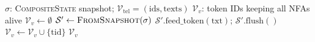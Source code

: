 
\begin{algorithm}[H]
\caption{\textsc{BuildGanaMask}: Dynamic NFA Token Mask}
\label{alg:build-mask}
\scriptsize
\begin{algorithmic}[1]
\Require $\sigma$: \textsc{CompositeState} snapshot;\;
         $\mathcal{V}_{\text{tel}} = (\text{ids}, \text{texts})$
\Ensure $\mathcal{V}_v$: token IDs keeping all NFAs alive
\State $\mathcal{V}_v \gets \emptyset$
    \State $\mathcal{S}' \gets
           \textsc{FromSnapshot}(\sigma)$
    \State $\mathcal{S}'.\text{feed\_token}(\text{txt})$;\;
           $\mathcal{S}'.\text{flush}()$
        \State $\mathcal{V}_v \gets \mathcal{V}_v
               \cup \{\text{tid}\}$
    \EndIf
\EndFor
\State \Return $\mathcal{V}_v$
\end{algorithmic}
\end{algorithm}



